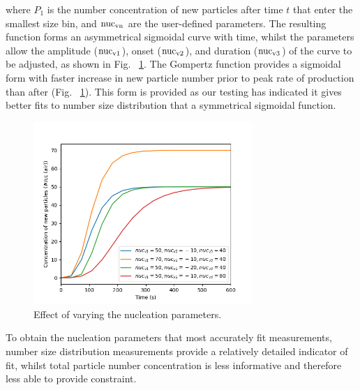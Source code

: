 \documentclass[gmd, manuscript]{copernicus}
\begin{document}
where $P_{1}$ is the number concentration of new particles after time $t$ that enter the smallest size bin, and $\rm{nuc_{vn}}$ are the user-defined parameters.  The resulting function forms an asymmetrical sigmoidal curve with time, whilst the parameters allow the amplitude ($\rm{nuc_{v1}}$), onset ($\rm{nuc_{v2}}$), and duration ($\rm{nuc_{v3}}$) of the curve to be adjusted, as shown in Fig. ~\ref{fig:nuc_sens}.  The Gompertz function provides a sigmoidal form with faster increase in new particle number prior to peak rate of production than after (Fig. ~\ref{fig:nuc_sens}).  This form is provided as our testing has indicated it gives better fits to number size distribution that a symmetrical sigmoidal function.

\begin{figure}[t]
\includegraphics[width=8.3cm]{Results/nuc_sens.png}
\caption{Effect of varying the nucleation parameters.}
\label{fig:nuc_sens}
\end{figure}

To obtain the nucleation parameters that most accurately fit measurements, number size distribution measurements provide a relatively detailed indicator of fit, whilst total particle number concentration is less informative and therefore less able to provide constraint.
\end{document}
